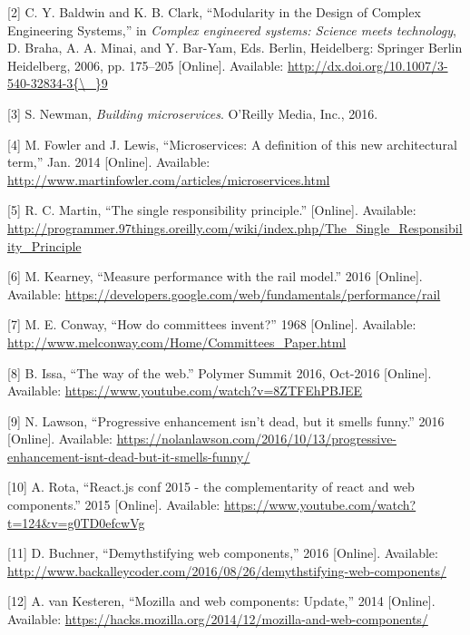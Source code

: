 \documentclass[]{article}
\begin{document}
\hypertarget{ref-Baldwin2006}{}
{[}2{]} C. Y. Baldwin and K. B. Clark, ``Modularity in the Design of
Complex Engineering Systems,'' in \emph{Complex engineered systems:
Science meets technology}, D. Braha, A. A. Minai, and Y. Bar-Yam, Eds.
Berlin, Heidelberg: Springer Berlin Heidelberg, 2006, pp. 175--205
{[}Online{]}. Available:
\href{http://dx.doi.org/10.1007/3-540-32834-3\%7B/_\%7D9}{http://dx.doi.org/10.1007/3-540-32834-3\{\textbackslash{}\_\}9}

\hypertarget{ref-Newman2015}{}
{[}3{]} S. Newman, \emph{Building microservices}. O'Reilly Media, Inc.,
2016.

\hypertarget{ref-Fowler2014}{}
{[}4{]} M. Fowler and J. Lewis, ``Microservices: A definition of this
new architectural term,'' Jan. 2014 {[}Online{]}. Available:
\url{http://www.martinfowler.com/articles/microservices.html}

\hypertarget{ref-Martin}{}
{[}5{]} R. C. Martin, ``The single responsibility principle.''
{[}Online{]}. Available:
\url{http://programmer.97things.oreilly.com/wiki/index.php/The_Single_Responsibility_Principle}

\hypertarget{ref-Kearney2016}{}
{[}6{]} M. Kearney, ``Measure performance with the rail model.'' 2016
{[}Online{]}. Available:
\url{https://developers.google.com/web/fundamentals/performance/rail}

\hypertarget{ref-Conway1968}{}
{[}7{]} M. E. Conway, ``How do committees invent?'' 1968 {[}Online{]}.
Available: \url{http://www.melconway.com/Home/Committees_Paper.html}

\hypertarget{ref-Issa2016}{}
{[}8{]} B. Issa, ``The way of the web.'' Polymer Summit 2016, Oct-2016
{[}Online{]}. Available:
\url{https://www.youtube.com/watch?v=8ZTFEhPBJEE}

\hypertarget{ref-Lawson2016}{}
{[}9{]} N. Lawson, ``Progressive enhancement isn't dead, but it smells
funny.'' 2016 {[}Online{]}. Available:
\url{https://nolanlawson.com/2016/10/13/progressive-enhancement-isnt-dead-but-it-smells-funny/}

\hypertarget{ref-Rota2015}{}
{[}10{]} A. Rota, ``React.js conf 2015 - the complementarity of react
and web components.'' 2015 {[}Online{]}. Available:
\url{https://www.youtube.com/watch?t=124\&v=g0TD0efcwVg}

\hypertarget{ref-Buchner2016}{}
{[}11{]} D. Buchner, ``Demythstifying web components,'' 2016
{[}Online{]}. Available:
\url{http://www.backalleycoder.com/2016/08/26/demythstifying-web-components/}

\hypertarget{ref-vanKesteren2014}{}
{[}12{]} A. van Kesteren, ``Mozilla and web components: Update,'' 2014
{[}Online{]}. Available:
\url{https://hacks.mozilla.org/2014/12/mozilla-and-web-components/}
\end{document}
